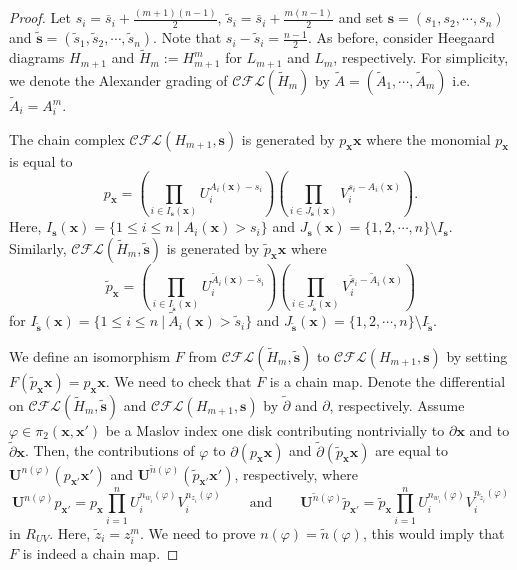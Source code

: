 \documentclass{amsart}
\newcommand{\cCFL}{\mathcal{C\!F\!L}}
\newcommand{\ovl}{\overline}
\newcommand{\x}{\mathbf{x}}
\def\x{\mathbf{x}}
\newcommand{\UU}{\mathbf{U}}
\renewcommand{\ss}{\mathbf{s}}
\begin{document}
\begin{proof}
Let $s_i=\ovl{s}_i+\frac{(m+1)(n-1)}{2}$, $\widetilde{s}_i=\ovl{s}_i+\frac{m(n-1)}{2}$ and set $\ss=(s_1,s_2,\cdots,s_n)$ and $\widetilde{\ss}=(\widetilde{s}_1,\widetilde{s}_2,\cdots,\widetilde{s}_n)$. Note that $s_i-\widetilde{s}_i=\frac{n-1}{2}$.
As before, consider Heegaard diagrams $H_{m+1}$ and $\widetilde{H}_m:=H^{m}_{m+1}$ for $L_{m+1}$ and $L_m$, respectively. For simplicity, we denote the Alexander grading of $\cCFL(\widetilde{H}_m)$ by $\widetilde{A}=(\widetilde{A}_1,\cdots,\widetilde{A}_m)$ i.e. $\widetilde{A}_i=A^m_i$.

The chain complex $\cCFL(H_{m+1},\ss)$ is generated by $p_{\x}\x$ where the monomial $p_{\x}$ is equal to \[p_{\x}=\left(\prod_{i\in I_{\ss}(\x)}U_i^{A_i(\x)-s_i}\right)\left(\prod_{i\in J_{\ss}(\x)}V_i^{s_i-A_i(\x)}\right).\]
Here, $I_{\ss}(\x)=\{1\le i\le n\ |\ A_i(\x)>s_i\}$ and $J_{\ss}(\x)=\{1,2,\cdots,n\}\setminus I_{\ss}$. Similarly, $\cCFL(\widetilde{H}_{m},\tilde{\ss})$ is generated by $\widetilde{p}_{\x}\x$ where  
\[\widetilde{p}_{\x}=\left(\prod_{i\in I_{\widetilde{\ss}}(\x)}U_i^{\widetilde{A}_i(\x)-\widetilde{s}_i}\right)\left(\prod_{i\in J_{\widetilde{\ss}}(\x)}V_i^{\widetilde{s}_i-\widetilde{A}_i(\x)}\right)\]
for $I_{\widetilde{\ss}}(\x)=\{1\le i\le n\ |\ \widetilde{A}_i(\x)>\widetilde{s}_i\}$ and $J_{\widetilde{\ss}}(\x)=\{1,2,\cdots,n\}\setminus I_{\widetilde{\ss}}$.




 
 We define an isomorphism $F$ from $\cCFL(\widetilde{H}_{m},\widetilde{\ss})$ to $\cCFL(H_{m+1},\ss)$
by setting $F(\widetilde{p}_\x\x)=p_\x\x$. We need to check that $F$ is a chain map. Denote the differential on $\cCFL(\widetilde{H}_{m},\widetilde{\ss})$ and $\cCFL(H_{m+1},\ss)$ by $\widetilde{\partial}$ and $\partial$, respectively.
Assume $\varphi\in\pi_2(\x,\x')$ be a Maslov index one disk contributing nontrivially to $\partial \x$ and to $\widetilde{\partial}\x$. Then, 
the contributions of $\varphi$ to $\partial(p_{\x}\x)$ and $\widetilde{\partial}(\widetilde{p}_{\x}\x)$ are equal to $\UU^{n(\varphi)}(p_{\x'}\x')$ and  $\UU^{\widetilde{n}(\varphi)}(\widetilde{p}_{\x'}\x')$, respectively, where
\begin{equation}
\label{eq: def n(phi)}
\UU^{n(\varphi)}p_{\x'}=p_{\x}\prod_{i=1}^nU_i^{n_{w_i}(\varphi)}V_i^{n_{z_i}(\varphi)}\quad\quad \text{and}\quad\quad\UU^{\widetilde{n}(\varphi)}\widetilde{p}_{\x'}=\widetilde{p}_{\x}\prod_{i=1}^nU_i^{n_{w_i}(\varphi)}V_i^{n_{\widetilde{z}_i}(\varphi)} 
\end{equation}
in $R_{UV}$. Here, $\widetilde{z}_i=z_i^m$.  We need to prove $n(\varphi)=\widetilde{n}(\varphi)$, this would imply that $F$ is indeed a chain map.


\end{proof}
\end{document}

